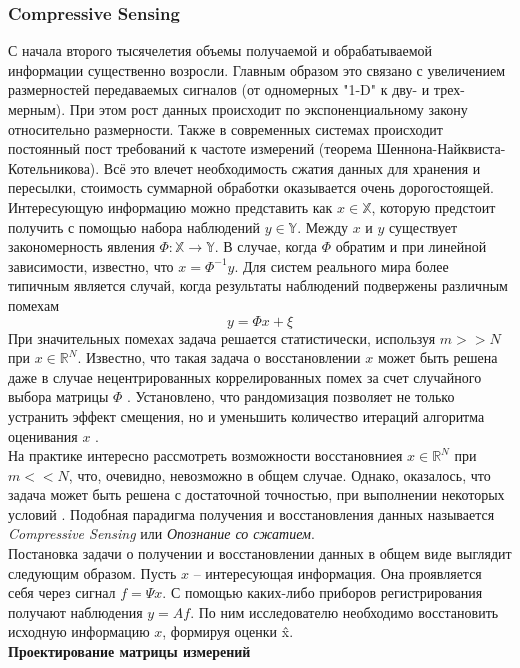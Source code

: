 \documentclass[14pt]{matmex-diploma}
\begin{document}
\subsubsection{Compressive Sensing} \label{sec:cs_description}
С начала второго тысячелетия объемы получаемой и обрабатываемой информации существенно возросли. Главным образом это связано с увеличением размерностей передаваемых сигналов (от одномерных "1-D" к дву- и  трех- мерным). При этом рост данных происходит по экспоненциальному закону относительно размерности. Также в современных системах происходит постоянный пост требований к частоте измерений (теорема Шеннона-Найквиста-Котельникова). Всё это влечет необходимость сжатия данных для хранения и пересылки, стоимость суммарной обработки оказывается очень дорогостоящей.
Интересующую информацию можно представить как $x \in \mathbb{X}$, которую предстоит получить с помощью набора наблюдений $y \in \mathbb{Y}$. Между $x$ и $y$ существует закономерность явления $\Phi:\mathbb{X}\to\mathbb{Y}$. В случае, когда $\Phi$ обратим и при линейной зависимости, известно, что $x = \Phi^{-1}y $. Для систем реального мира более типичным является случай, когда результаты наблюдений подвержены различным помехам \[y = \Phi x + \xi\] 
При значительных помехах задача решается статистически, используя $m >> N$ при $x \in \mathbb{R}^N$. Известно, что такая задача о восстановлении $x$ может быть решена даже в случае нецентрированных коррелированных помех за счет случайного выбора матрицы $\Phi$ \cite{granichin2004linear}. Установлено, что рандомизация позволяет не только устранить эффект смещения, но и уменьшить количество итераций алгоритма оценивания $x$ \cite{граничин2003рандомизированные}. \\
На практике интересно рассмотреть возможности восстановниея $x \in \mathbb{R}^N$ при $m << N$, что, очевидно, невозможно в общем случае. Однако, оказалось, что задача может быть решена с достаточной точностью, при выполнении некоторых условий \cite{donoho2006compressed}. Подобная парадигма получения и восстановления данных называется \textit{Compressive Sensing} или \textit{Опознание со сжатием}. \\
Постановка задачи о получении и восстановлении данных в общем виде выглядит следующим образом. Пусть $x$ -- интересующая информация. Она проявляется себя через сигнал $f = \Psi x$. С помощью каких-либо приборов регистрирования получают наблюдения $y = A f$. По ним исследователю необходимо восстановить исходную информацию $x$, формируя оценки \^{x}. \\
\textbf{Проектирование матрицы измерений}\\
\end{document}
